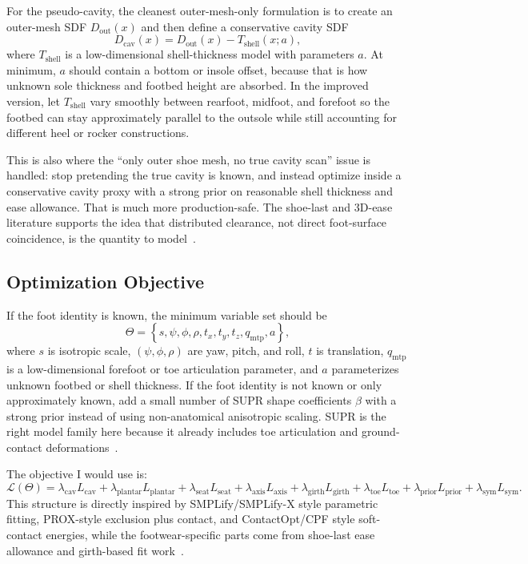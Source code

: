 \documentclass[11pt]{article}
\begin{document}
For the pseudo-cavity, the cleanest outer-mesh-only formulation is to create an outer-mesh SDF $D_{\mathrm{out}}(x)$ and then define a conservative cavity SDF
\begin{equation}
D_{\mathrm{cav}}(x)=D_{\mathrm{out}}(x)-T_{\mathrm{shell}}(x;a),
\end{equation}
where $T_{\mathrm{shell}}$ is a low-dimensional shell-thickness model with parameters $a$. At minimum, $a$ should contain a bottom or insole offset, because that is how unknown sole thickness and footbed height are absorbed. In the improved version, let $T_{\mathrm{shell}}$ vary smoothly between rearfoot, midfoot, and forefoot so the footbed can stay approximately parallel to the outsole while still accounting for different heel or rocker constructions.

This is also where the ``only outer shoe mesh, no true cavity scan'' issue is handled: stop pretending the true cavity is known, and instead optimize inside a conservative cavity proxy with a strong prior on reasonable shell thickness and ease allowance. That is much more production-safe. The shoe-last and 3D-ease literature supports the idea that distributed clearance, not direct foot-surface coincidence, is the quantity to model~\cite{bao-last,ease-allowance}.

\subsection{Optimization Objective}

If the foot identity is known, the minimum variable set should be
\begin{equation}
\Theta = \left\{
s,\psi,\phi,\rho,t_x,t_y,t_z,q_{\mathrm{mtp}},a
\right\},
\end{equation}
where $s$ is isotropic scale, $(\psi,\phi,\rho)$ are yaw, pitch, and roll, $t$ is translation, $q_{\mathrm{mtp}}$ is a low-dimensional forefoot or toe articulation parameter, and $a$ parameterizes unknown footbed or shell thickness. If the foot identity is not known or only approximately known, add a small number of SUPR shape coefficients $\beta$ with a strong prior instead of using non-anatomical anisotropic scaling. SUPR is the right model family here because it already includes toe articulation and ground-contact deformations~\cite{supr-foot}.

The objective I would use is:
\begin{equation}
\mathcal{L}(\Theta) =
\lambda_{\mathrm{cav}} L_{\mathrm{cav}}
+ \lambda_{\mathrm{plantar}} L_{\mathrm{plantar}}
+ \lambda_{\mathrm{seat}} L_{\mathrm{seat}}
+ \lambda_{\mathrm{axis}} L_{\mathrm{axis}}
+ \lambda_{\mathrm{girth}} L_{\mathrm{girth}}
+ \lambda_{\mathrm{toe}} L_{\mathrm{toe}}
+ \lambda_{\mathrm{prior}} L_{\mathrm{prior}}
+ \lambda_{\mathrm{sym}} L_{\mathrm{sym}}.
\end{equation}
This structure is directly inspired by SMPLify/SMPLify-X style parametric fitting, PROX-style exclusion plus contact, and ContactOpt/CPF style soft-contact energies, while the footwear-specific parts come from shoe-last ease allowance and girth-based fit work~\cite{fitness-lasts,smplify,smplifyx,prox,contactopt,cpf}.
\end{document}
